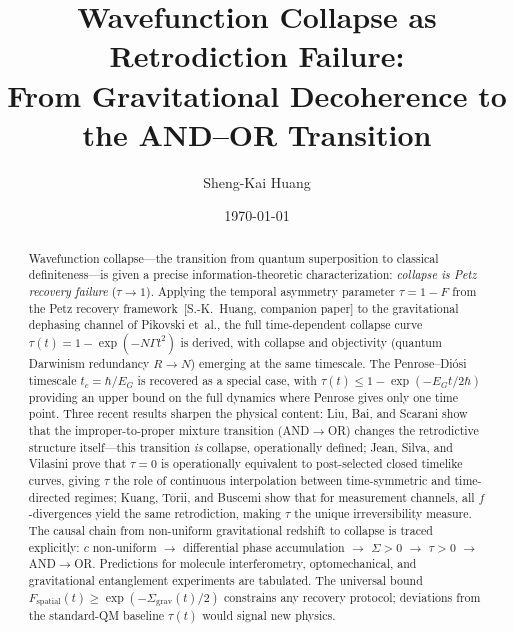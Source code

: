 \documentclass[prl,twocolumn,superscriptaddress,longbibliography,floatfix]{revtex4-2}
\newcommand{\tauasym}{\tau}
\begin{document}
\title{Wavefunction Collapse as Retrodiction Failure:\\
From Gravitational Decoherence to the AND--OR Transition}

\author{Sheng-Kai Huang}

\date{\today}

\begin{abstract}
Wavefunction collapse---the transition from quantum superposition to
classical definiteness---is given a precise information-theoretic
characterization: \emph{collapse is Petz recovery failure}
($\tauasym \to 1$).  Applying the temporal asymmetry parameter
$\tauasym = 1 - F$ from the Petz recovery framework~[S.-K.\ Huang,
companion paper] to the gravitational dephasing channel of
Pikovski et~al., the full time-dependent collapse curve
$\tauasym(t) = 1 - \exp(-N\Gamma t^2)$ is derived, with collapse and
objectivity (quantum Darwinism redundancy $R \to N$) emerging at the
same timescale.  The Penrose--Di\'{o}si timescale $t_c = \hbar/E_G$ is
recovered as a special case, with
$\tauasym(t) \leq 1 - \exp(-E_G t/2\hbar)$ providing an upper bound
on the full dynamics where Penrose gives only one time point.  Three recent results sharpen
the physical content: Liu, Bai, and Scarani show that the
improper-to-proper mixture transition (AND$\to$OR) changes the
retrodictive structure itself---this transition \emph{is} collapse,
operationally defined; Jean, Silva, and Vilasini prove that
$\tauasym = 0$ is operationally equivalent to post-selected closed
timelike curves, giving $\tauasym$ the role of continuous interpolation
between time-symmetric and time-directed regimes; Kuang, Torii, and
Buscemi show that for measurement channels, all $f$-divergences yield
the same retrodiction, making $\tauasym$ the unique irreversibility
measure.  The causal chain from non-uniform gravitational redshift to
collapse is traced explicitly: $c$ non-uniform $\to$ differential
phase accumulation $\to$ $\Sigma > 0$ $\to$ $\tauasym > 0$ $\to$
AND$\to$OR.  Predictions for molecule interferometry, optomechanical,
and gravitational entanglement experiments are tabulated.  The
universal bound
$F_{\mathrm{spatial}}(t) \geq \exp(-\Sigma_{\mathrm{grav}}(t)/2)$
constrains any recovery protocol; deviations from the standard-QM
baseline $\tauasym(t)$ would signal new physics.
\end{abstract}

\maketitle
\end{document}
